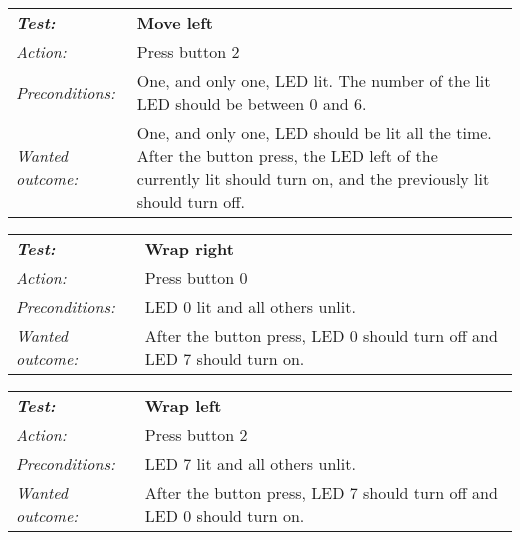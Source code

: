 \begin{tabular}[h]{lp{12cm}} \hline
\textbf{\emph{Test:}} 		& \textbf{Move left}\\
\emph{Action:} 		& Press button 2\\
\emph{Preconditions:}	& One, and only one, LED lit. The number of the lit LED should be between 0 and 6.\\
\emph{Wanted outcome:}	& One, and only one, LED should be lit all the time. After the button press, the LED left of the currently lit should turn on, and the previously lit should turn off. \\ \hline
\end{tabular}

\begin{tabular}[h]{lp{12cm}} \hline
\textbf{\emph{Test:}} 		& \textbf{Wrap right}\\
\emph{Action:} 		& Press button 0\\
\emph{Preconditions:}	& LED 0 lit and all others unlit.\\
\emph{Wanted outcome:}	& After the button press, LED 0 should turn off and LED 7 should turn on.\\ \hline
\end{tabular}

\begin{tabular}[h]{lp{12cm}} \hline
\textbf{\emph{Test:}} 		& \textbf{Wrap left}\\
\emph{Action:} 		& Press button 2\\
\emph{Preconditions:}	& LED 7 lit and all others unlit.\\
\emph{Wanted outcome:}	& After the button press, LED 7 should turn off and LED 0 should turn on.\\ \hline
\end{tabular}


